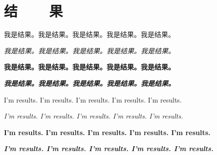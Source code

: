 \chapter{结~~~~果}


我是结果。我是结果。我是结果。我是结果。我是结果。

\textit{我是结果。我是结果。我是结果。我是结果。我是结果。}

\textbf{我是结果。我是结果。我是结果。我是结果。我是结果。}

\textbf{\textit{我是结果。我是结果。我是结果。我是结果。我是结果。}}

I'm results. I'm results. I'm results. I'm results. I'm results. 

\textit{I'm results. I'm results. I'm results. I'm results. I'm results. }

\textbf{I'm results. I'm results. I'm results. I'm results. I'm results. }

\textbf{\textit{I'm results. I'm results. I'm results. I'm results. I'm results. }}

\clearpage